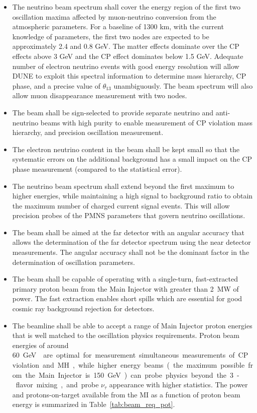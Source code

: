\begin{itemize} 
\item The neutrino beam spectrum shall cover the energy
  region of the first two oscillation maxima affected by muon-neutrino
  conversion from the atmospheric parameters. For a baseline of 1300
  km, with the current knowledge of parameters, the first two nodes
  are expected to be approximately 2.4 and 0.8 GeV. The matter effects
  dominate over the CP effects above 3 GeV and the CP effect dominates
  below 1.5 GeV. Adequate number of electron neutrino events with good
  energy resolution will allow DUNE to exploit this spectral
  information to determine mass hierarchy, CP phase, and a precise
  value of $\theta_{13}$ unambiguously. The beam spectrum will also
  allow muon disappearance measurement with two nodes.

\item The beam shall be sign-selected to provide separate neutrino and
  anti-neutrino beams with high purity to enable measurement of CP
  violation mass hierarchy, and precision oscillation measurement.

\item The electron neutrino content in the beam shall be kept small so
  that the systematic errors on the additional background has a small
  impact on the CP phase measurement (compared to the statistical
  error).

\item The neutrino beam spectrum shall extend beyond the first maximum
  to higher energies, while maintaining a high signal to background
  ratio to obtain the maximum number of charged current signal events.
  This will allow precision probes of the PMNS parameters that govern
  neutrino oscillations.

\item The beam shall be aimed at the far detector with an angular
  accuracy that allows the determination of the far detector spectrum
  using the near detector measurements.  The angular accuracy shall
  not be the dominant factor in the determination of oscillation
  parameters.
  
\item The beam shall be capable of operating with a single-turn,
  fast-extracted primary proton beam from the Main Injector with
  greater than 2~MW of power. The fast extraction enables short spills
  which are essential for good cosmic ray background rejection for
  detectors. 

\item The beamline shall be able to accept a range of Main Injector
  proton energies that is well matched to the oscillation physics
  requirements. Proton beam energies of around \SI{60}\GeV{} are
  optimal for measurement simultaneous measurements of CP violation
  and MH, while higher energy beams (the maximum possible from the
  Main Injector is \SI{150}\GeV) can probe physics beyond the 3-flavor
  mixing, and probe $\nu_\tau$ appearance with higher statistics. The
  power and protons-on-target available from the MI as a function of
  proton beam energy is summarized in Table~\ref{tab:beam_req_pot}.
 
\end{itemize}


